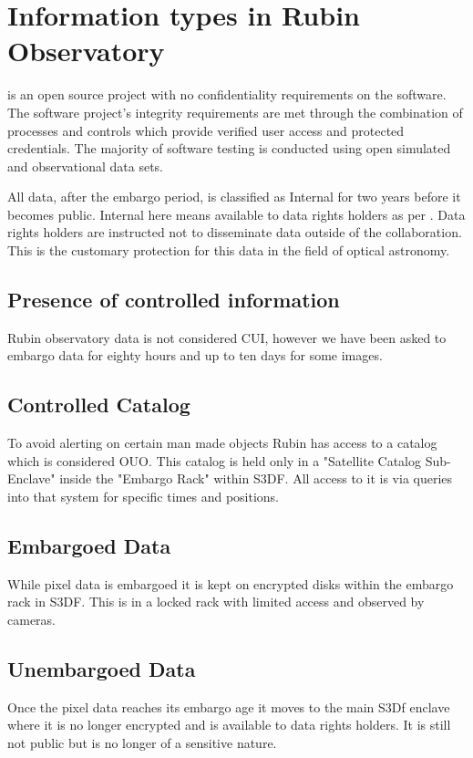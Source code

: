 \section{Information types in Rubin Observatory} \label{sec:infotypes}

\VRO is an open source project with no confidentiality requirements on the software.
The software project’s integrity requirements are met through the combination of
processes and controls which provide verified user access and protected credentials.
The majority of software testing is conducted using open simulated and observational data sets.

All data, after the embargo period,  is classified as Internal for two years before it becomes public.
Internal here means available to data rights holders as per .
Data rights holders are instructed not to disseminate data outside of the collaboration.
This is the customary protection for this data in the field of optical astronomy.

\subsection{Presence of controlled information}\label{sec:cui}
Rubin observatory data is not considered \gls{CUI}, however we have been asked to embargo data for eighty hours and up to ten days for some images.

\subsection{Controlled Catalog}\label{sec:controllescat}
To avoid alerting on certain man made objects Rubin has access to a catalog which is considered \gls{OUO}.
This catalog is held only in a "Satellite Catalog Sub-Enclave" inside the "Embargo Rack" within S3DF.
All access to it is via queries into that system for specific times and positions.

\subsection{Embargoed Data} \label{sec:embargo}
While pixel data is embargoed it is kept on encrypted disks within the embargo rack in S3DF.
This is in a locked rack with limited access and observed by cameras.

\subsection{Unembargoed Data}
Once the pixel data reaches its embargo age it moves to the main S3Df enclave where it is no longer encrypted and is available to data rights holders. It is still not public but is no longer of a sensitive nature.

